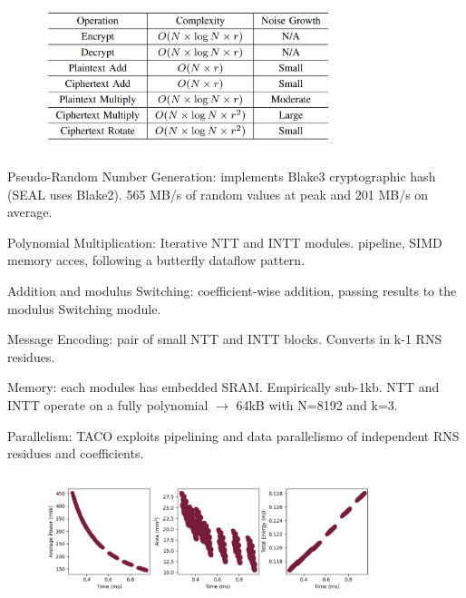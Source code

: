 \documentclass[10pt]{beamer}
\begin{document}
\begin{frame}[noframenumbering]
\frametitle{}
\begin{figure}
    \includegraphics[width=0.75\textwidth]{complexity.png}
\end{figure}

\end{frame}

\begin{frame}[noframenumbering]
\frametitle{}
    Pseudo-Random Number Generation: implements Blake3 cryptographic hash (SEAL uses Blake2).
    565 MB/s of random values at peak and 201 MB/s on average.

    Polynomial Multiplication: Iterative NTT and INTT modules. pipeline, SIMD memory acces, following a
    butterfly dataflow pattern.

    Addition and modulus Switching: coefficient-wise addition, passing results to the modulus Switching module.

    Message Encoding: pair of small NTT and INTT blocks. Converts in k-1 RNS residues.

    Memory: each modules has embedded SRAM. Empirically sub-1kb. NTT and INTT operate on a fully
    polynomial $\rightarrow$ 64kB with N=8192 and k=3.

    Parallelism: TACO exploits pipelining and data parallelismo of independent RNS residues and coefficients.


\end{frame}

\begin{frame}[noframenumbering]
\frametitle{}
\begin{figure}
    \includegraphics[width=0.85\textwidth]{design-space.png}
\end{figure}
\end{frame}
\end{document}
